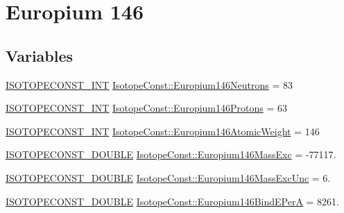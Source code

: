 \hypertarget{group___isotope_const-_europium-_eu146}{}\section{Europium 146}
\label{group___isotope_const-_europium-_eu146}
\subsection*{Variables}
\begin{DoxyCompactItemize}
\item 
\mbox{\hyperlink{group___isotope_const-_macros_ga5f18360b3e99483a35c32d789e62621c}{I\+S\+O\+T\+O\+P\+E\+C\+O\+N\+S\+T\+\_\+\+I\+NT}} \mbox{\hyperlink{group___isotope_const-_europium-_eu146_gaab6bde1a790ea57ce44529cf835b0f7a}{Isotope\+Const\+::\+Europium146\+Neutrons}} = 83
\item 
\mbox{\hyperlink{group___isotope_const-_macros_ga5f18360b3e99483a35c32d789e62621c}{I\+S\+O\+T\+O\+P\+E\+C\+O\+N\+S\+T\+\_\+\+I\+NT}} \mbox{\hyperlink{group___isotope_const-_europium-_eu146_gaa3fa954899cf7040882bedcdfab93d7a}{Isotope\+Const\+::\+Europium146\+Protons}} = 63
\item 
\mbox{\hyperlink{group___isotope_const-_macros_ga5f18360b3e99483a35c32d789e62621c}{I\+S\+O\+T\+O\+P\+E\+C\+O\+N\+S\+T\+\_\+\+I\+NT}} \mbox{\hyperlink{group___isotope_const-_europium-_eu146_gaf0e06be623e920b97e47bb41760c42f1}{Isotope\+Const\+::\+Europium146\+Atomic\+Weight}} = 146
\item 
\mbox{\hyperlink{group___isotope_const-_macros_ga8f45a7272ce02c0b4c65c44636ed719a}{I\+S\+O\+T\+O\+P\+E\+C\+O\+N\+S\+T\+\_\+\+D\+O\+U\+B\+LE}} \mbox{\hyperlink{group___isotope_const-_europium-_eu146_ga24a1cae86dfb3d69c970c32837d91cb8}{Isotope\+Const\+::\+Europium146\+Mass\+Exc}} = -\/77117.
\item 
\mbox{\hyperlink{group___isotope_const-_macros_ga8f45a7272ce02c0b4c65c44636ed719a}{I\+S\+O\+T\+O\+P\+E\+C\+O\+N\+S\+T\+\_\+\+D\+O\+U\+B\+LE}} \mbox{\hyperlink{group___isotope_const-_europium-_eu146_gab6eda92713f687290a3610dc7568e533}{Isotope\+Const\+::\+Europium146\+Mass\+Exc\+Unc}} = 6.
\item 
\mbox{\hyperlink{group___isotope_const-_macros_ga8f45a7272ce02c0b4c65c44636ed719a}{I\+S\+O\+T\+O\+P\+E\+C\+O\+N\+S\+T\+\_\+\+D\+O\+U\+B\+LE}} \mbox{\hyperlink{group___isotope_const-_europium-_eu146_ga081dae881bdefa9f63581c892cf10b44}{Isotope\+Const\+::\+Europium146\+Bind\+E\+PerA}} = 8261.
\item 

\end{DoxyCompactItemize}
